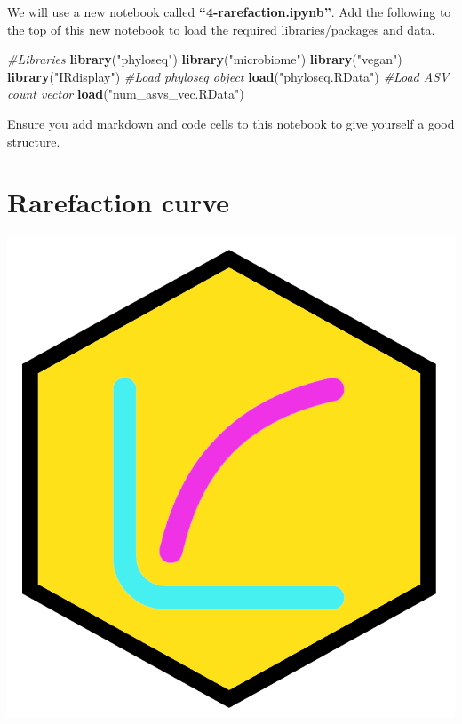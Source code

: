 \documentclass[
]{book}
\newenvironment{Shaded}{\begin{snugshade}}{\end{snugshade}}
\newcommand{\CommentTok}[1]{\textcolor[rgb]{0.56,0.35,0.01}{\textit{#1}}}
\newcommand{\FunctionTok}[1]{\textcolor[rgb]{0.13,0.29,0.53}{\textbf{#1}}}
\newcommand{\NormalTok}[1]{#1}
\newcommand{\StringTok}[1]{\textcolor[rgb]{0.31,0.60,0.02}{#1}}
\begin{document}
We will use a new notebook called \textbf{``4-rarefaction.ipynb''}.
Add the following to the top of this new notebook to load the required libraries/packages and data.

\begin{Shaded}
\begin{Highlighting}[]
\CommentTok{\#Libraries}
\FunctionTok{library}\NormalTok{(}\StringTok{"phyloseq"}\NormalTok{)}
\FunctionTok{library}\NormalTok{(}\StringTok{"microbiome"}\NormalTok{)}
\FunctionTok{library}\NormalTok{(}\StringTok{"vegan"}\NormalTok{)}
\FunctionTok{library}\NormalTok{(}\StringTok{"IRdisplay"}\NormalTok{)}
\CommentTok{\#Load phyloseq object}
\FunctionTok{load}\NormalTok{(}\StringTok{"phyloseq.RData"}\NormalTok{)}
\CommentTok{\#Load ASV count vector}
\FunctionTok{load}\NormalTok{(}\StringTok{"num\_asvs\_vec.RData"}\NormalTok{)}
\end{Highlighting}
\end{Shaded}

Ensure you add markdown and code cells to this notebook to give yourself
a good structure.

\hypertarget{rarefaction-curve}{%
\section{Rarefaction curve}\label{rarefaction-curve}}

\includegraphics{figures/rarefaction.png}
\end{document}
